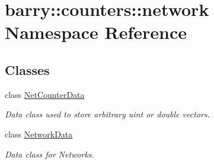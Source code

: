 \hypertarget{namespacebarry_1_1counters_1_1network}{}\section{barry\+:\+:counters\+:\+:network Namespace Reference}
\label{namespacebarry_1_1counters_1_1network}
\subsection*{Classes}
\begin{DoxyCompactItemize}
\item 
class \hyperlink{classbarry_1_1counters_1_1network_1_1_net_counter_data}{Net\+Counter\+Data}
\begin{DoxyCompactList}\small\item\em Data class used to store arbitrary uint or double vectors. \end{DoxyCompactList}\item 
class \hyperlink{classbarry_1_1counters_1_1network_1_1_network_data}{Network\+Data}
\begin{DoxyCompactList}\small\item\em Data class for Networks. \end{DoxyCompactList}\end{DoxyCompactItemize}
